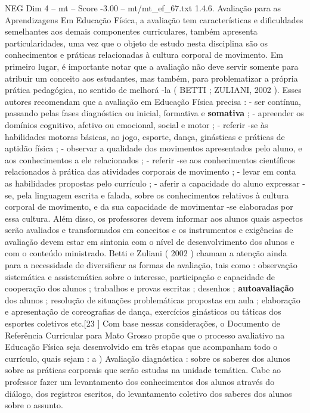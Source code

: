 \begin{textsample}{NEG Dim 4 – mt – Score -3.00 – mt/mt\_ef\_67.txt}  \label{ex:f4_neg_116}
1.4.6.
Avaliação para as Aprendizagens Em Educação Física, a avaliação tem características e dificuldades semelhantes aos demais componentes curriculares, também apresenta particularidades, uma vez que o objeto de estudo nesta disciplina são os conhecimentos e práticas relacionadas à cultura corporal de movimento.
Em primeiro lugar, é importante notar que a avaliação não deve servir somente para atribuir um conceito aos estudantes, mas também, para problematizar a própria prática pedagógica, no sentido de melhorá -la ( BETTI ; ZULIANI, 2002 ).
Esses autores recomendam que a avaliação em Educação Física precisa : - ser contínua, passando pelas fases diagnóstica ou inicial, formativa e \textbf{somativa} ; - apreender os domínios cognitivo, afetivo ou emocional, social e motor ; - referir -se às habilidades motoras básicas, ao jogo, esporte, dança, ginásticas e práticas de aptidão física ; - observar a qualidade dos movimentos apresentados pelo aluno, e aos conhecimentos a ele relacionados ; - referir -se aos conhecimentos científicos relacionados à prática das atividades corporais de movimento ; - levar em conta as habilidades propostas pelo currículo ; - aferir a capacidade do aluno expressar -se, pela linguagem escrita e falada, sobre os conhecimentos relativos à cultura corporal de movimento, e da sua capacidade de movimentar -se elaboradas por essa cultura.
Além disso, os professores devem informar aos alunos quais aspectos serão avaliados e transformados em conceitos e os instrumentos e exigências de avaliação devem estar em sintonia com o nível de desenvolvimento dos alunos e com o conteúdo ministrado.
Betti e Zuliani ( 2002 ) chamam a atenção ainda para a necessidade de diversificar as formas de avaliação, tais como : observação sistemática e assistemática sobre o interesse, participação e capacidade de cooperação dos alunos ; trabalhos e provas escritas ; desenhos ; \textbf{autoavaliação} dos alunos ; resolução de situações problemáticas propostas em aula ; elaboração e apresentação de coreografias de dança, exercícios ginásticos ou táticas dos esportes coletivos etc.[23 ] Com base nessas considerações, o Documento de Referência Curricular para Mato Grosso propõe que o processo avaliativo na Educação Física seja desenvolvido em três etapas que acompanham todo o currículo, quais sejam : a ) Avaliação diagnóstica : sobre os saberes dos alunos sobre as práticas corporais que serão estudas na unidade temática.
Cabe ao professor fazer um levantamento dos conhecimentos dos alunos através do diálogo, dos registros escritos, do levantamento coletivo dos saberes dos alunos sobre o assunto.

\end{textsample}
